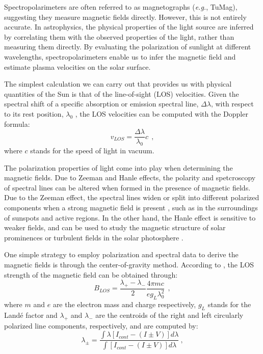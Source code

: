 Spectropolarimeters are often referred to as magnetographs (\textit{e.g.}, TuMag), suggesting they measure magnetic fields directly. However, this is not entirely accurate. In astrophysics, the physical properties of the light source are inferred by correlating them with the observed properties of the light, rather than measuring them directly. By evaluating the polarization of sunlight at different wavelengths, spectropolarimeters enable us to infer the magnetic field and estimate plasma velocities on the solar surface. 

The simplest calculation we can carry out that provides us with physical quantities of the Sun is that of the line-of-sight (LOS) velocities. Given the spectral shift of a specific absorption or emission spectral line, $\Delta \lambda$, with respect to its rest position, $\lambda _ 0$ , the LOS velocities can be computed with the Doppler formula: 
\begin{equation}
  v_{LOS} = \frac{\Delta \lambda}{\lambda _ 0}c\ \ ,
  \label{eq_spectro: Doppler}
\end{equation}
where $c$ stands for the speed of light in vacuum. 

The polarization properties of light come into play when determining the magnetic fields. Due to Zeeman and Hanle effects, the polarity and spetcroscopy of spectral lines can be altered when formed in the presence of magnetic fields. Due to the Zeeman effect, the spectral lines widen or split into different polarized components when a strong magnetic field is present \citep{libro_JoseCarlos}, such as in the surroundings of sunspots and active regions. In the other hand, the Hanle effect is sensitive to weaker fields, and can be used to study the magnetic structure of solar prominences or turbulent fields in the solar photosphere \citep{hanle}. 

One simple strategy to employ polarization and spectral data to derive the magnetic fields is through the center-of-gravity method. According to \cite{center_of_gravity}, the LOS strength of the magnetic field can be obtained through:
\begin{equation}
  B_{LOS} = \frac{\lambda _ {+} - \lambda _ -}{2}\frac{4\pi m c}{eg_{L}\lambda_0 ^2}\ \ ,
  \label{eq_spectro: Blos-cog}
\end{equation}  
where $m$ and $e$ are the electron mass and charge respectively, $g_L$ stands for the Landé factor and $\lambda _ {+}$ and $\lambda _ {-}$ are the centroids of the right and left circularly polarized line components, respectively, and are computed by:
\begin{equation}
  \lambda _ {\pm} = \frac{\int \lambda \left[I_{cont} - (I \pm V)\right]d\lambda}{\int \left[I_{cont} - (I \pm V)\right]d\lambda} \ ,
  \label{eq_spectro: lambda_plus_minus}
\end{equation} 

